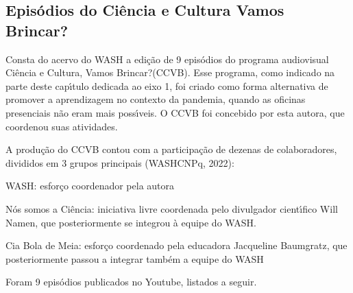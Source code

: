 \documentclass[
12pt,		%
openright,	%
twoside,  %
a4paper,			%
chapter=TITLE,		%
english,			%
french,				%
spanish,			%
brazil				%
]{USPSC-classe/USPSC}
\begin{document}
\subsection[Epis\'odios do \textquotedbl Ci\^encia e Cultura Vamos Brincar?\textquotedbl ]{Epis\'odios do \textquotedbl Ci\^encia e Cultura Vamos Brincar?\textquotedbl }\label{Epis\'odios do \textquotedbl Ci\^encia e Cultura Vamos Brincar?\textquotedbl }
Consta do acervo do WASH a edi\c{c}\~ao de 9 epis\'odios do programa audiovisual \textquotedbl Ci\^encia e Cultura, Vamos Brincar?\textquotedbl  (CCVB). Esse programa, como indicado na parte deste cap\'{\i}tulo dedicada ao eixo 1, foi criado como forma alternativa de promover a aprendizagem no contexto da pandemia, quando as oficinas presenciais n\~ao eram mais poss\'{\i}veis. O CCVB foi concebido por esta autora, que coordenou suas atividades.

















A produ\c{c}\~ao do CCVB contou com a participa\c{c}\~ao de dezenas de colaboradores, divididos em 3 grupos principais  (WASHCNPq, 2022):


















\begin{alineas}
\item WASH: esfor\c{c}o coordenador pela autora
\item \textquotedbl N\'os somos a Ci\^encia\textquotedbl : iniciativa livre coordenada pelo divulgador cient\'{\i}fico Will Namen, que posteriormente se integrou \`a equipe do WASH.
\item Cia Bola de Meia: esfor\c{c}o coordenado pela educadora Jacqueline Baumgratz, que posteriormente passou a integrar tamb\'em a equipe do WASH
\end{alineas}

Foram 9 epis\'odios publicados no Youtube, listados a seguir.
\end{document}
